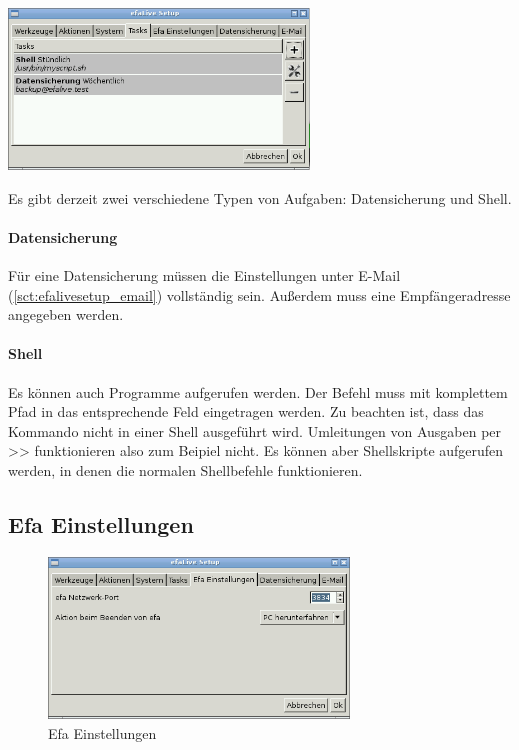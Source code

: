 \documentclass[a4paper,12pt,twoside]{article}
\begin{document}
\bigskip
\begin{minipage}{\linewidth}
    \centering
    \captionsetup{type=figure}
    \includegraphics[width=8cm]{screenshots/efalive_setup_tasks.png}
    \label{fig:efalivesetup_tasks}
\end{minipage}
\bigskip

Es gibt derzeit zwei verschiedene Typen von Aufgaben: Datensicherung und Shell.

\paragraph{Datensicherung}
Für eine Datensicherung müssen die Einstellungen unter E-Mail (\ref{sct:efalivesetup_email})
vollständig sein. Außerdem muss eine Empfängeradresse angegeben werden.

\paragraph{Shell}
Es können auch Programme aufgerufen werden. Der Befehl muss mit komplettem Pfad in 
das entsprechende Feld eingetragen werden. Zu beachten ist, dass das Kommando nicht 
in einer Shell ausgeführt wird. Umleitungen von Ausgaben per >> funktionieren also
zum Beipiel nicht. Es können aber Shellskripte aufgerufen werden, in denen 
die normalen Shellbefehle funktionieren.


\subsection{Efa Einstellungen}
\label{sct:efalivesetup_efa_settings}

\begin{figure}
    \centering
    \captionsetup{type=figure}
    \includegraphics[width=8cm]{screenshots/efalive_setup_efa-settings.png}
    \caption{Efa Einstellungen}
    \label{fig:efalivesetup_efasettings}
\end{figure}
\end{document}
